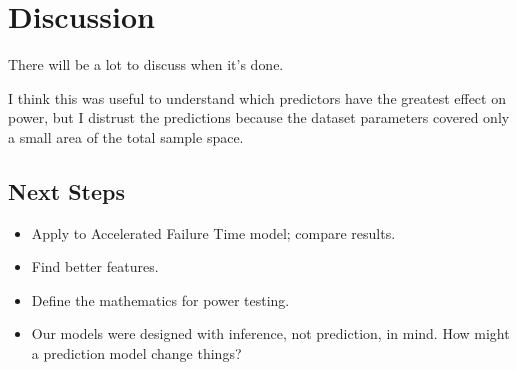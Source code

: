 \section{Discussion}

There will be a lot to discuss when it's done. 

I think this was useful to understand which predictors have the greatest effect on power, but I distrust the predictions because the dataset parameters covered only a small area of the total sample space.

\subsection{Next Steps}

\begin{itemize}
    \item Apply to Accelerated Failure Time model; compare results. 
    \item Find better features.
    \item Define the mathematics for power testing.
    \item Our models were designed with inference, not prediction, in mind. How might a prediction model change things?
\end{itemize}





